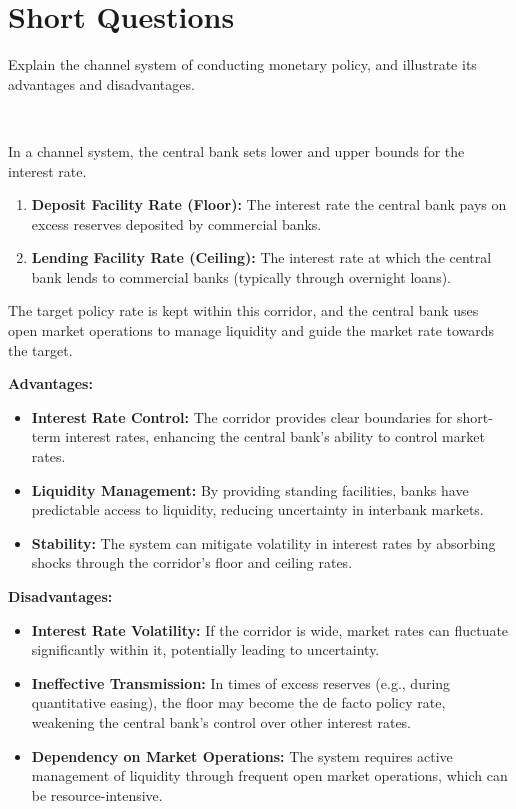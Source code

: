 \section*{Short Questions}

\begin{problem*}[2]
    Explain the channel system of conducting monetary policy, and illustrate its advantages and disadvantages.
\end{problem*}

\begin{solution}
    \

    In a channel system, the central bank sets lower and upper bounds 
    for the interest rate. 
    \begin{enumerate}
        \item \textbf{Deposit Facility Rate (Floor):} The interest rate the central bank pays on excess reserves deposited by commercial banks.
        \item \textbf{Lending Facility Rate (Ceiling):} The interest rate at which the central bank lends to commercial banks (typically through overnight loans).
    \end{enumerate}
    The target policy rate is kept within this corridor, 
    and the central bank uses open market operations to manage 
    liquidity and guide the market rate towards the target.

    \textbf{Advantages:}
    \begin{itemize}
        \item \textbf{Interest Rate Control:} The corridor provides clear boundaries for short-term interest rates, enhancing the central bank's ability to control market rates.
        \item \textbf{Liquidity Management:} By providing standing facilities, banks have predictable access to liquidity, reducing uncertainty in interbank markets.
        \item \textbf{Stability:} The system can mitigate volatility in interest rates by absorbing shocks through the corridor's floor and ceiling rates.
    \end{itemize}

    \textbf{Disadvantages:}
    \begin{itemize}
        \item \textbf{Interest Rate Volatility:} If the corridor is wide, market rates can fluctuate significantly within it, potentially leading to uncertainty.
        \item \textbf{Ineffective Transmission:} In times of excess reserves (e.g., during quantitative easing), the floor may become the de facto policy rate, weakening the central bank's control over other interest rates.
        \item \textbf{Dependency on Market Operations:} The system requires active management of liquidity through frequent open market operations, which can be resource-intensive.
    \end{itemize}
\end{solution}

